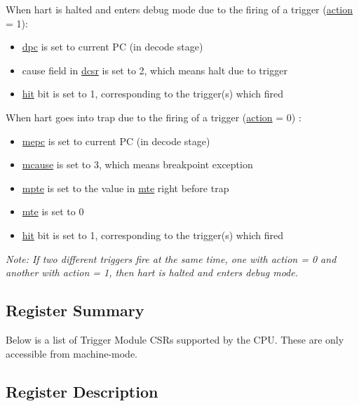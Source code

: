 \documentclass[main\_\_EN.tex]{subfiles}
\begin{document}
When hart is halted and enters debug mode due to the firing of a trigger (\hyperref[fielddesc:MCONTROLACTION]{action} = 1):
\begin{itemize}
    \item \hyperref[regdesc:DPC]{dpc} is set to current PC (in decode stage)
    \item cause field in \hyperref[regdesc:DCSR]{dcsr} is set to 2, which means halt due to trigger
    \item \hyperref[fielddesc:MCONTROLHIT]{hit} bit is set to 1, corresponding to the trigger(s) which fired
\end{itemize}

When hart goes into trap due to the firing of a trigger (\hyperref[fielddesc:MCONTROLACTION]{action} = 0) :
\begin{itemize}
    \item \hyperref[regdesc:MEPC]{mepc} is set to current PC (in decode stage)
    \item \hyperref[regdesc:MCAUSE]{mcause} is set to 3, which means breakpoint exception
    \item \hyperref[fielddesc:TCONTROLMPTE]{mpte} is set to the value in \hyperref[fielddesc:TCONTROLMTE]{mte} right before trap
    \item \hyperref[fielddesc:TCONTROLMTE]{mte} is set to 0
    \item \hyperref[fielddesc:MCONTROLHIT]{hit} bit is set to 1, corresponding to the trigger(s) which fired
\end{itemize}

\textit{Note: If two different triggers fire at the same time, one with action = 0 and another with action = 1, then hart is halted and enters debug mode.}


\hypertarget{riscvcpu-hwt-reg-summ}{}
\subsection{Register Summary}
\label{sec:riscvcpu-hwt-reg-summ}


Below is a list of Trigger Module CSRs supported by the CPU. These are only accessible from machine-mode.




\subsection{Register Description}
\end{document}
